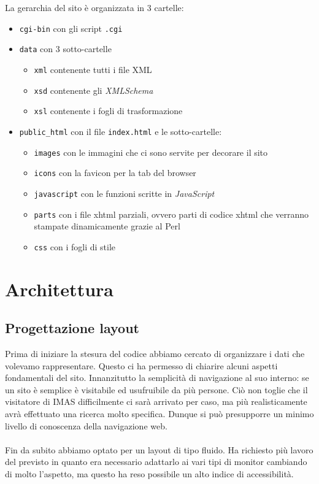 \documentclass[11pt]{article}
\begin{document}
La gerarchia del sito è organizzata in 3 cartelle:
\begin{itemize}
	\item \texttt{cgi-bin} con gli script \texttt{.cgi}
	\item \texttt{data} con 3 sotto-cartelle
	\begin{itemize}
		\item \texttt{xml} contenente tutti i file XML
		\item \texttt{xsd} contenente gli \textit{XMLSchema}
		\item \texttt{xsl} contenente i fogli di trasformazione
	\end{itemize}
	\item \texttt{public\_html} con il file \texttt{index.html} e le sotto-cartelle:
	\begin{itemize}
		\item \texttt{images} con le immagini che ci sono servite per decorare il sito
		\item \texttt{icons} con la favicon per la tab del browser
		\item \texttt{javascript} con le funzioni scritte in \textit{JavaScript}
		\item \texttt{parts} con i file xhtml parziali, ovvero parti di codice xhtml che verranno stampate dinamicamente grazie al Perl
		\item \texttt{css} con i fogli di stile  
	\end{itemize}
\end{itemize}

\newpage
\section{Architettura}

\subsection{Progettazione layout}

Prima di iniziare la stesura del codice abbiamo cercato di organizzare i dati che volevamo rappresentare. Questo ci ha permesso di chiarire alcuni aspetti fondamentali del sito. Innanzitutto la semplicità di navigazione al suo interno: se un sito è semplice è visitabile ed usufruibile da più persone. Ciò non toglie che il visitatore di IMAS difficilmente ci sarà arrivato per caso, ma più realisticamente avrà effettuato una ricerca molto specifica. Dunque si può presupporre un minimo livello di conoscenza della navigazione web.
\\
\\
Fin da subito abbiamo optato per un layout di tipo fluido. Ha richiesto più lavoro del previsto in quanto era necessario adattarlo ai vari tipi di monitor cambiando di molto l'aspetto, ma questo ha reso possibile un alto indice di accessibilità.
\end{document}
